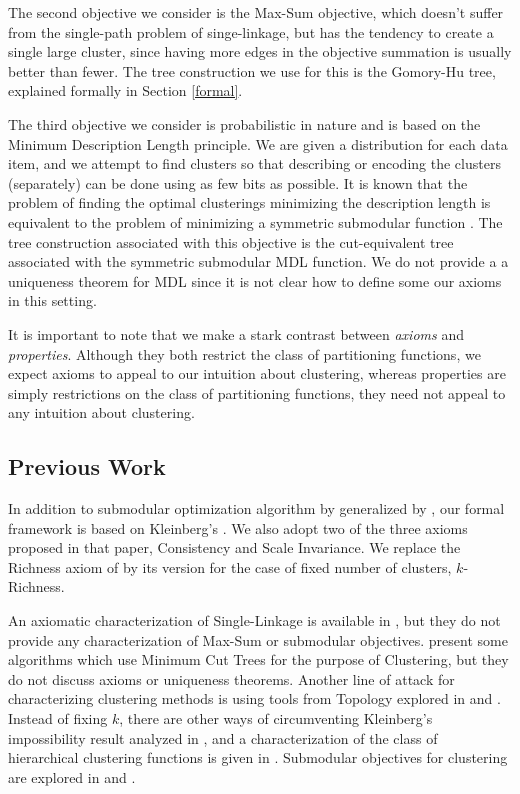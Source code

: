 \documentclass[twoside,11pt]{article}
\begin{document}
The second objective we consider is the Max-Sum objective, which doesn't suffer from
the single-path problem of singe-linkage, but has the tendency to create a single large
cluster, since having more edges in the objective summation is usually better than fewer. The
tree construction we use for this is the Gomory-Hu tree, explained formally in Section \ref{formal}.

The third objective we consider is probabilistic in nature and is based on the Minimum
Description Length principle. We are given a distribution for each data item, and we attempt to find 
clusters so that describing or encoding the clusters
(separately) can be done using as few bits as possible. It is known that the problem
of finding the optimal clusterings minimizing the description length is equivalent to the
problem of minimizing a symmetric submodular function \citep{qclustering}. The tree construction associated with this objective
is the cut-equivalent tree associated with the symmetric submodular MDL function. We do not provide a
a uniqueness theorem for MDL since it is not clear how to define some our axioms in this setting.

It is important to note that we make a stark contrast between \textit{axioms} and \textit{properties}. Although
they both restrict the class of partitioning functions, we expect axioms to appeal to our intuition about clustering,
whereas properties are simply restrictions on the class of partitioning functions, they need not appeal to any
intuition about clustering.

\subsection{Previous Work}

In addition to submodular optimization algorithm by \cite{queyranne} generalized by \cite{rizzi}, our formal framework is based on Kleinberg's \citep{klein1}. We also adopt two of the three axioms proposed in that paper, Consistency and Scale Invariance. We replace the Richness axiom of \cite{klein1} by its version for the case of fixed number of clusters, $k$-Richness.

An axiomatic characterization of Single-Linkage is available in \cite{bosagh2009}, but they do not provide any characterization of Max-Sum or submodular objectives. \cite{flake} present some algorithms which use Minimum Cut Trees for the purpose of Clustering, but they do not discuss axioms or uniqueness theorems. Another line of attack for characterizing clustering methods is using tools from Topology explored in \cite{carlsson2010characterization} and \cite{carlsson2008persistent}. Instead of fixing $k$, there are other ways of circumventing Kleinberg's impossibility result analyzed in \cite{ackerman09}, and a characterization of the class of hierarchical clustering functions is given in \cite{ackerman10}. Submodular objectives for clustering are explored in \cite{steffi} and \cite{qclustering}.
\end{document}
